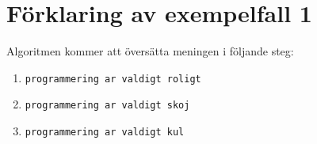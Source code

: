 \section*{Förklaring av exempelfall 1}
Algoritmen kommer att översätta meningen i följande steg:
\begin{enumerate}
    \item \texttt{programmering ar valdigt roligt}
    \item \texttt{programmering ar valdigt skoj}
    \item \texttt{programmering ar valdigt kul}
\end{enumerate}